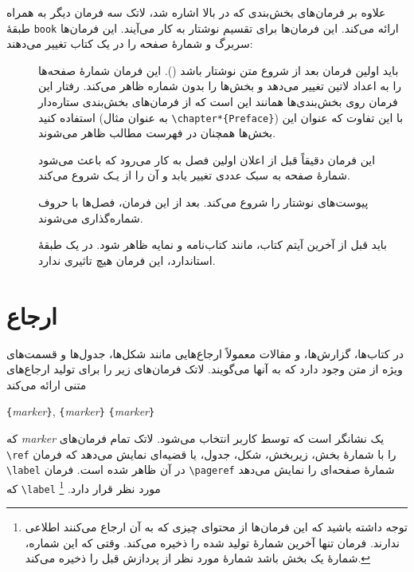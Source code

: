 علاوه بر فرمان‌های بخش‌بندی که در بالا اشاره شد، لاتک سه فرمان دیگر به همراه طبقهٔ 
\verb|book|
ارائه می‌کند. این فرمان‌ها برای تقسیم نوشتار به کار می‌آیند. این فرمان‌ها سربرگ و شمارهٔ صفحه را در یک کتاب تغییر می‌دهند:
\begin{description}
\item[] 
باید اولین فرمان بعد از شروع متن نوشتار باشد 
(\verb||). 
این فرمان شمارهٔ صفحه‌ها را به اعداد لاتین تغییر می‌دهد و بخش‌ها را بدون شماره ظاهر می‌کند. رفتار این فرمان روی بخش‌بندی‌ها همانند این است که از فرمان‌های بخش‌بندی ستاره‌دار استفاده کنید (به عنوان مثال 
\verb|\chapter*{Preface}|)
با این تفاوت که عنوان این بخش‌ها همچنان در فهرست مطالب ظاهر می‌شوند.
\item[] 
این فرمان دقیقاً قبل از اعلان اولین فصل به کار می‌رود که باعث می‌شود شمارهٔ صفحه به سبک عددی تغییر یابد و آن را از یـک شروع می‌کند.
\item[] 
پیوست‌های نوشتار را شروع می‌کند. بعد از این فرمان، فصل‌ها با حروف شماره‌\-گذاری می‌شوند.
\item[] 
باید قبل از آخرین آیتم کتاب، مانند کتاب‌نامه و نمایه ظاهر شود. در یک طبقهٔ استاندارد، این فرمان هیچ تاثیری ندارد.
\end{description}

\section{ارجاع}
در کتاب‌ها، گزارش‌ها، و مقالات معمولاً ارجاع‌هایی مانند شکل‌ها، جدول‌ها و قسمت‌های ویژه از متن وجود دارد که به آنها 
می‌گویند. لاتک فرمان‌های زیر را برای تولید ارجاع‌های متنی ارائه می‌کند

\begin{lscommand}
\verb|{|\emph{marker}\verb|}|, \verb|{|\emph{marker}\verb|}| 
 \verb|{|\emph{marker}\verb|}|
\end{lscommand}

\noindent 
که 
\emph{marker}
یک نشانگر است که توسط کاربر انتخاب می‌شود. لاتک تمام فرمان‌های 
\verb|\ref|
را با شمارهٔ بخش، زیربخش، شکل، جدول، یا قضیه‌ای نمایش می‌دهد که فرمان 
\verb|\label|
در آن ظاهر شده است. فرمان 
\verb|\pageref|
شمارهٔ صفحه‌ای را نمایش می‌دهد که 
\verb|\label|
مورد نظر قرار دارد.%
\footnote{توجه داشته باشید که این فرمان‌ها از محتوای چیزی که به آن ارجاع می‌کنند اطلاعی ندارند. فرمان تنها آخرین شمارهٔ تولید شده را ذخیره می‌کند. وقتی که این شماره، شمارهٔ یک بخش باشد شمارهٔ مورد نظر از پردازش قبل را ذخیره می‌کند.}

